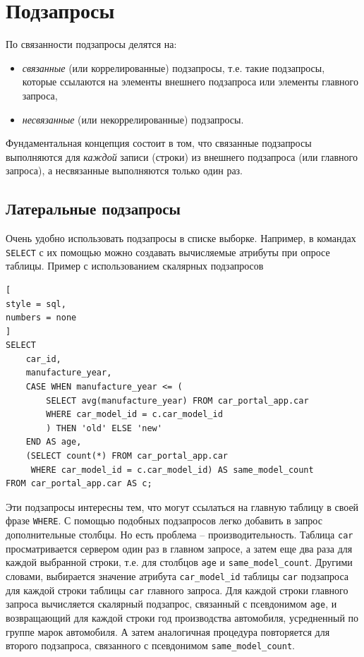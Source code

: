 \documentclass[%
	11pt,
	a4paper,
	utf8,
		]{article}
\begin{document}
\section{Подзапросы}

По связанности подзапросы делятся на:
\begin{itemize}
	\item \emph{связанные} (или коррелированные) подзапросы, т.е. такие подзапросы, которые ссылаются на элементы внешнего подзапроса или элементы главного запроса,
	
	\item \emph{несвязанные} (или некоррелированные) подзапросы.
\end{itemize}

Фундаментальная концепция состоит в том, что связанные подзапросы выполняются для \emph{каждой} записи (строки) из внешнего подзапроса (или главного запроса), а несвязанные выполняются только один раз.

\subsection{Латеральные подзапросы}

Очень удобно использовать подзапросы в списке выборке. Например, в командах \texttt{SELECT} с их помощью можно создавать вычисляемые атрибуты при опросе таблицы. Пример с использованием скалярных подзапросов
\begin{lstlisting}[
style = sql,
numbers = none
]
SELECT
    car_id,
    manufacture_year,
    CASE WHEN manufacture_year <= (
        SELECT avg(manufacture_year) FROM car_portal_app.car
        WHERE car_model_id = c.car_model_id
        ) THEN 'old' ELSE 'new'
    END AS age,
    (SELECT count(*) FROM car_portal_app.car
     WHERE car_model_id = c.car_model_id) AS same_model_count
FROM car_portal_app.car AS c;
\end{lstlisting}

Эти подзапросы интересны тем, что могут ссылаться на главную таблицу в своей фразе \texttt{WHERE}. С помощью подобных подзапросов легко добавить в запрос дополнительные столбцы. Но есть проблема -- производительность. Таблица \texttt{car} просматривается сервером один раз в главном запросе, а затем еще два раза для каждой выбранной строки, т.е. для столбцов \texttt{age} и \texttt{same\_model\_count}. Другими словами, выбирается значение атрибута \texttt{car\_model\_id} таблицы \texttt{car} подзапроса для каждой строки таблицы \texttt{car} главного запроса. Для каждой строки главного запроса вычисляется скалярный подзапрос, связанный с псевдонимом \texttt{age}, и возвращающий для каждой строки год производства автомобиля, усредненный по группе марок автомобиля. А затем аналогичная процедура повторяется для второго подзапроса, связанного с псевдонимом \texttt{same\_model\_count}.
\end{document}

